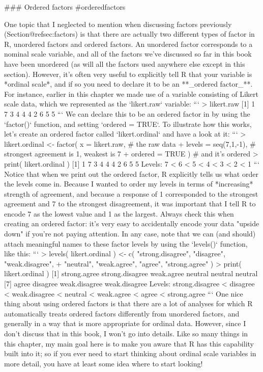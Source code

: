 ### Ordered factors {#orderedfactors}

One topic that I neglected to mention when discussing factors previously (Section@refsec:factors) is that there are actually two different types of factor in R, unordered factors and ordered factors. An unordered factor corresponds to a nominal scale variable, and all of the factors we've discussed so far in this book have been unordered (as will all the factors used anywhere else except in this section). However, it's often very useful to explicitly tell R that your variable is *ordinal scale*, and if so you need to declare it to be an **_ordered factor_**. For instance, earlier in this chapter we made use of a variable consisting of Likert scale data, which we represented as the `likert.raw` variable:
```
> likert.raw
 [1] 1 7 3 4 4 4 2 6 5 5
```
We can declare this to be an ordered factor in by using the `factor()` function, and setting `ordered = TRUE`. To illustrate how this works, let's create an ordered factor called `likert.ordinal` and have a look at it:
```
> likert.ordinal <- factor( x = likert.raw,        # the raw data 
+                           levels = seq(7,1,-1),  # strongest agreement is 1, weakest is 7
+                           ordered = TRUE )       # and it's ordered
> print( likert.ordinal )
 [1] 1 7 3 4 4 4 2 6 5 5
Levels: 7 < 6 < 5 < 4 < 3 < 2 < 1
```
Notice that when we print out the ordered factor, R explicitly tells us what order the levels come in. Because I wanted to order my levels in terms of *increasing* strength of agreement, and because a response of 1 corresponded to the strongest agreement and 7 to the strongest disagreement, it was important that I tell R to encode 7 as the lowest value and 1 as the largest. Always check this when creating an ordered factor: it's very easy to accidentally encode your data "upside down" if you're not paying attention. In any case, note that we can (and should) attach meaningful names to these factor levels by using the `levels()` function, like this:
```
> levels( likert.ordinal ) <- c( "strong.disagree", "disagree", "weak.disagree", 
+                                "neutral", "weak.agree", "agree", "strong.agree" )
> print( likert.ordinal )
 [1] strong.agree    strong.disagree weak.agree      neutral         neutral         neutral        
 [7] agree           disagree        weak.disagree   weak.disagree  
Levels: strong.disagree < disagree < weak.disagree < neutral < weak.agree < agree < strong.agree
```
One nice thing about using ordered factors is that there are a lot of analyses for which R automatically treats ordered factors differently from unordered factors, and generally in a way that is more appropriate for ordinal data. However, since I don't discuss that in this book, I won't go into details. Like so many things in this chapter, my main goal here is to make you aware that R has this capability built into it; so if you ever need to start thinking about ordinal scale variables in more detail, you have at least some idea where to start looking!




